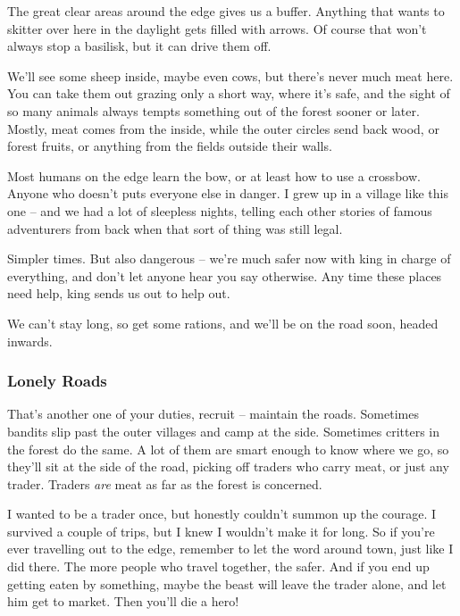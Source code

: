 \begin{multicols}{2}
\begin{exampletext}
  The great clear areas around the \gls{edge} gives us a buffer.
  Anything that wants to skitter over here in the daylight gets filled with arrows.
  Of course that won't always stop a basilisk, but it can drive them off.

  We'll see some sheep inside, maybe even cows, but there's never much meat here.
  You can take them out grazing only a short way, where it's safe, and the sight of so many animals always tempts something out of the forest sooner or later.
  Mostly, meat comes from the inside, while the outer circles send back wood, or forest fruits, or anything from the fields outside their walls.

  Most humans on the \gls{edge} learn the bow, or at least how to use a crossbow.
  Anyone who doesn't puts everyone else in danger.
  I grew up in a village like this one -- and we had a lot of sleepless nights, telling each other stories of famous adventurers from back when that sort of thing was still legal.

  Simpler times.
  But also dangerous -- we're much safer now with \gls{king} in charge of everything, and don't let anyone hear you say otherwise.
  Any time these places need help, \gls{king} sends us out to help out.

  We can't stay long, so get some rations, and we'll be on the road soon, headed inwards.

  \subsubsection*{Lonely Roads}

  That's another one of your duties, recruit -- maintain the roads.
  Sometimes bandits slip past the outer villages and camp at the side.
  Sometimes critters in the forest do the same.
  A lot of them are smart enough to know where we go, so they'll sit at the side of the road, picking off traders who carry meat, or just any trader.
  Traders \emph{are} meat as far as the forest is concerned.

  I wanted to be a trader once, but honestly couldn't summon up the courage.
  I survived a couple of trips, but I knew I wouldn't make it for long.
  So if you're ever travelling out to the \gls{edge}, remember to let the word around town, just like I did there.
  The more people who travel together, the safer.
  And if you end up getting eaten by something, maybe the beast will leave the trader alone, and let him get to market.
  Then you'll die a hero!


\end{exampletext}
\end{multicols}
